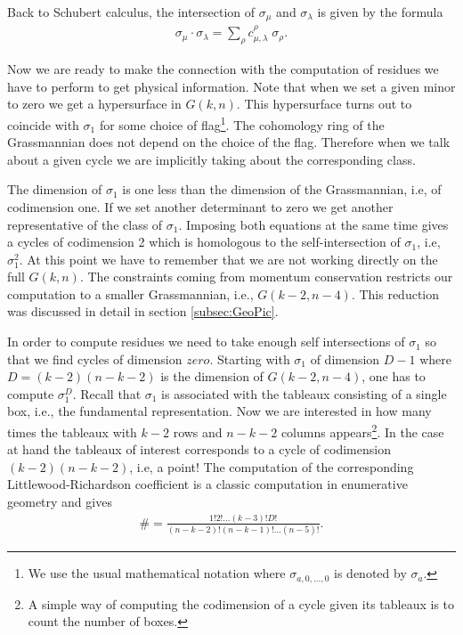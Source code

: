\documentclass[12pt]{article}
\newcommand{\be}{\begin{eqnarray}}
\newcommand{\ee}{\end{eqnarray}}
\begin{document}
Back to Schubert calculus, the intersection of $\sigma_\mu$ and $\sigma_\lambda$ is given by the formula
%
\be
\sigma_\mu \cdot \sigma_\lambda = \sum_\rho c_{\mu,\lambda}^\rho \; \sigma_\rho.
\ee
%


Now we are ready to make the connection with the computation of residues we have to perform to get physical information. Note that when we set a given minor to zero we get a hypersurface in $G(k,n)$. This hypersurface turns out to coincide with $\sigma_1$ for some choice of flag\footnote{We use the usual mathematical notation where $\sigma_{a,0,\ldots ,0}$ is denoted by $\sigma_a$.}. The cohomology ring of the Grassmannian does not depend on the choice of the flag. Therefore when we talk about a given cycle we are implicitly taking about the corresponding class.

The dimension of $\sigma_1$ is one less than the dimension of the Grassmannian, i.e, of codimension one. If we set another determinant to zero we get another representative of the class of $\sigma_1$. Imposing both equations at the same time gives a cycles of codimension 2 which is homologous to the self-intersection of $\sigma_1$, i.e, $\sigma_1^2$.
At this point we have to remember that we are not working directly on the full $G(k,n)$. The constraints coming from momentum conservation restricts our computation to a smaller Grassmannian, i.e., $G(k-2,n-4)$. This reduction was discussed in detail in section \ref{subsec:GeoPic}.

In order to compute residues we need to take enough self intersections of $\sigma_1$ so that we find cycles of dimension $zero$. Starting with $\sigma_1$ of dimension $D-1$ where $D=(k-2)(n-k-2)$ is the dimension of $G(k-2,n-4)$, one has to compute $\sigma_1^D$.
Recall that $\sigma_1$ is associated with the tableaux consisting of a single box, i.e., the fundamental representation. Now we are interested in how many times the tableaux with $k-2$ rows and $n-k-2$ columns appears\footnote{A simple way of computing the codimension of a cycle given its tableaux is to count the number of boxes.}. In the case at hand the tableaux of interest corresponds to a cycle of codimension $(k-2)(n-k-2)$, i.e, a point!
The computation of the corresponding Littlewood-Richardson coefficient is a classic computation in enumerative geometry and gives
%
\be
\label{magic}
\# = \frac{1!2!\ldots (k-3)!D!}{(n-k-2)!(n-k-1)!\ldots (n-5)!}.
\ee
%
\end{document}
